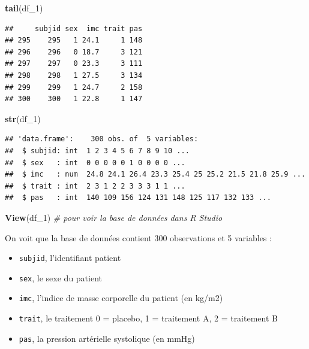 \documentclass[
]{book}
\newenvironment{Shaded}{\begin{snugshade}}{\end{snugshade}}
\newcommand{\CommentTok}[1]{\textcolor[rgb]{0.56,0.35,0.01}{\textit{#1}}}
\newcommand{\FunctionTok}[1]{\textcolor[rgb]{0.13,0.29,0.53}{\textbf{#1}}}
\newcommand{\NormalTok}[1]{#1}
\providecommand{\tightlist}{%
  \setlength{\itemsep}{0pt}\setlength{\parskip}{0pt}}
\begin{document}
\begin{Shaded}
\begin{Highlighting}[]
\FunctionTok{tail}\NormalTok{(df\_1)}
\end{Highlighting}
\end{Shaded}

\begin{verbatim}
##     subjid sex  imc trait pas
## 295    295   1 24.1     1 148
## 296    296   0 18.7     3 121
## 297    297   0 23.3     3 111
## 298    298   1 27.5     3 134
## 299    299   1 24.7     2 158
## 300    300   1 22.8     1 147
\end{verbatim}

\begin{Shaded}
\begin{Highlighting}[]
\FunctionTok{str}\NormalTok{(df\_1)}
\end{Highlighting}
\end{Shaded}

\begin{verbatim}
## 'data.frame':    300 obs. of  5 variables:
##  $ subjid: int  1 2 3 4 5 6 7 8 9 10 ...
##  $ sex   : int  0 0 0 0 0 1 0 0 0 0 ...
##  $ imc   : num  24.8 24.1 26.4 23.3 25.4 25 25.2 21.5 21.8 25.9 ...
##  $ trait : int  2 3 1 2 2 3 3 3 1 1 ...
##  $ pas   : int  140 109 156 124 131 148 125 117 132 133 ...
\end{verbatim}

\begin{Shaded}
\begin{Highlighting}[]
\FunctionTok{View}\NormalTok{(df\_1) }\CommentTok{\# pour voir la base de données dans R Studio}
\end{Highlighting}
\end{Shaded}

On voit que la base de données contient 300 observations et 5 variables :

\begin{itemize}
\tightlist
\item
  \texttt{subjid}, l'identifiant patient
\item
  \texttt{sex}, le sexe du patient
\item
  \texttt{imc}, l'indice de masse corporelle du patient (en kg/m2)
\item
  \texttt{trait}, le traitement 0 = placebo, 1 = traitement A, 2 = traitement B
\item
  \texttt{pas}, la pression artérielle systolique (en mmHg)
\end{itemize}
\end{document}
